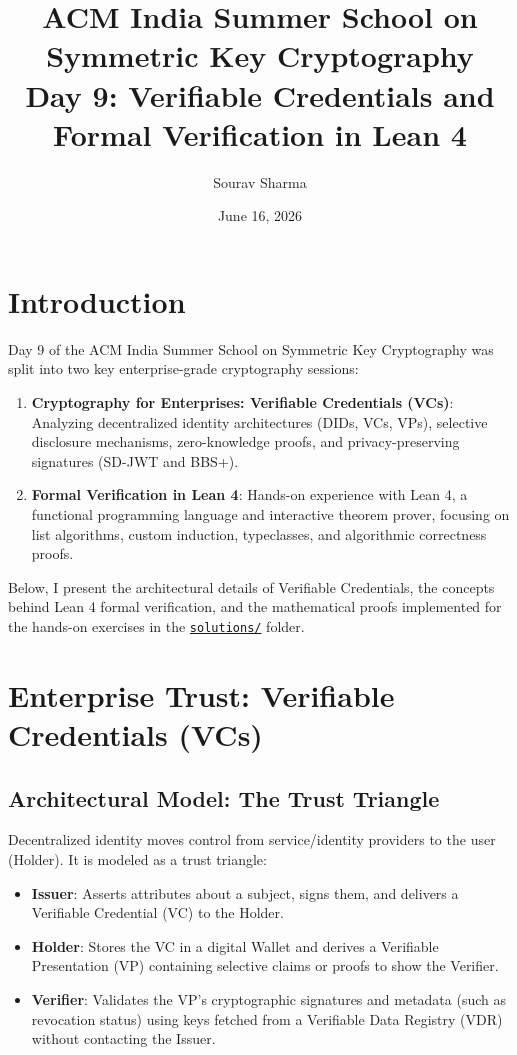\documentclass{article}
\title{ACM India Summer School on Symmetric Key Cryptography \\ Day 9: Verifiable Credentials and Formal Verification in Lean 4}
\author{Sourav Sharma}
\date{June 16, 2026}
\begin{document}
\maketitle

\section{Introduction}
Day 9 of the ACM India Summer School on Symmetric Key Cryptography was split into two key enterprise-grade cryptography sessions:
\begin{enumerate}
    \item \textbf{Cryptography for Enterprises: Verifiable Credentials (VCs)}: Analyzing decentralized identity architectures (DIDs, VCs, VPs), selective disclosure mechanisms, zero-knowledge proofs, and privacy-preserving signatures (SD-JWT and BBS+).
    \item \textbf{Formal Verification in Lean 4}: Hands-on experience with Lean 4, a functional programming language and interactive theorem prover, focusing on list algorithms, custom induction, typeclasses, and algorithmic correctness proofs.
\end{enumerate}

Below, I present the architectural details of Verifiable Credentials, the concepts behind Lean 4 formal verification, and the mathematical proofs implemented for the hands-on exercises in the \href{file:///home/scorzion/Tech/Crypto/SKC_IITH/Day9/solutions/}{\texttt{solutions/}} folder.

\section{Enterprise Trust: Verifiable Credentials (VCs)}

\subsection{Architectural Model: The Trust Triangle}
Decentralized identity moves control from service/identity providers to the user (Holder). It is modeled as a trust triangle:
\begin{itemize}
    \item \textbf{Issuer}: Asserts attributes about a subject, signs them, and delivers a Verifiable Credential (VC) to the Holder.
    \item \textbf{Holder}: Stores the VC in a digital Wallet and derives a Verifiable Presentation (VP) containing selective claims or proofs to show the Verifier.
    \item \textbf{Verifier}: Validates the VP's cryptographic signatures and metadata (such as revocation status) using keys fetched from a Verifiable Data Registry (VDR) without contacting the Issuer.
\end{itemize}
\end{document}
